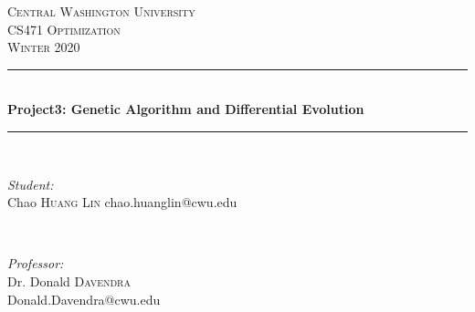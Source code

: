 \documentclass[12pt]{article}
\begin{document}
    
    \begin{titlepage}
        
        \newcommand{\HRule}{\rule{\linewidth}{0.5mm}} %
        
        \center %
        
        
        \textsc{\LARGE Central Washington University}\\[1.5cm] %
        \textsc{\Large CS471 Optimization}\\[0.5cm] %
        \textsc{\large Winter 2020}\\[0.5cm] %
        
        
        \HRule \\[0.4cm]
        { \huge \bfseries Project3: Genetic Algorithm and Differential Evolution}\\[0.2cm] %
        \HRule \\[1cm]
        
        
        \begin{minipage}{0.5\textwidth}
            \begin{flushleft} \large
                \emph{Student:}\\
                Chao \textsc{Huang Lin} chao.huanglin@cwu.edu
                
                
            \end{flushleft}
        \end{minipage}
        ~
        \begin{minipage}{0.45\textwidth}
            \begin{flushright} \large
                \emph{Professor:} \\
                Dr. Donald \textsc{Davendra}\\ %
                Donald.Davendra@cwu.edu
            \end{flushright}
        \end{minipage}\\[0.5cm]
        

\end{titlepage}
\end{document}
